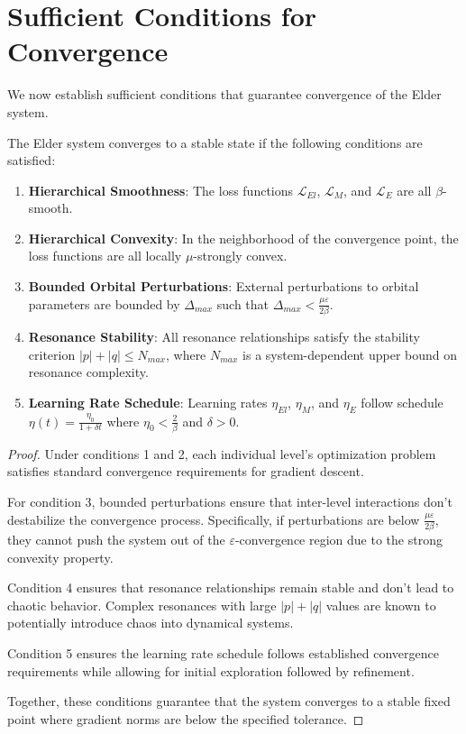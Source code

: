 \section{Sufficient Conditions for Convergence}

We now establish sufficient conditions that guarantee convergence of the Elder system.

\begin{theorem}
The Elder system converges to a stable state if the following conditions are satisfied:
\begin{enumerate}
    \item \textbf{Hierarchical Smoothness}: The loss functions $\mathcal{L}_{El}$, $\mathcal{L}_{M}$, and $\mathcal{L}_{E}$ are all $\beta$-smooth.
    \item \textbf{Hierarchical Convexity}: In the neighborhood of the convergence point, the loss functions are all locally $\mu$-strongly convex.
    \item \textbf{Bounded Orbital Perturbations}: External perturbations to orbital parameters are bounded by $\Delta_{max}$ such that $\Delta_{max} < \frac{\mu \varepsilon}{2\beta}$.
    \item \textbf{Resonance Stability}: All resonance relationships satisfy the stability criterion $|p| + |q| \leq N_{max}$, where $N_{max}$ is a system-dependent upper bound on resonance complexity.
    \item \textbf{Learning Rate Schedule}: Learning rates $\eta_{El}$, $\eta_M$, and $\eta_E$ follow schedule $\eta(t) = \frac{\eta_0}{1 + \delta t}$ where $\eta_0 < \frac{2}{\beta}$ and $\delta > 0$.
\end{enumerate}
\end{theorem}

\begin{proof}
Under conditions 1 and 2, each individual level's optimization problem satisfies standard convergence requirements for gradient descent.

For condition 3, bounded perturbations ensure that inter-level interactions don't destabilize the convergence process. Specifically, if perturbations are below $\frac{\mu \varepsilon}{2\beta}$, they cannot push the system out of the $\varepsilon$-convergence region due to the strong convexity property.

Condition 4 ensures that resonance relationships remain stable and don't lead to chaotic behavior. Complex resonances with large $|p|+|q|$ values are known to potentially introduce chaos into dynamical systems.

Condition 5 ensures the learning rate schedule follows established convergence requirements while allowing for initial exploration followed by refinement.

Together, these conditions guarantee that the system converges to a stable fixed point where gradient norms are below the specified tolerance.
\end{proof}

